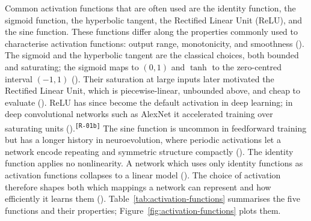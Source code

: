 \documentclass[12pt]{article}
\newcommand{\revID}[1]{\textsuperscript{\scriptsize\texttt{[#1]}}}
\newcommand{\revRepeat}[2]{\textcolor{revTeal}{#2}\revID{#1}}
\begin{document}
Common activation functions that are often used are the identity function, the sigmoid function, the hyperbolic tangent, the Rectified Linear Unit (ReLU), and the sine function.
These functions differ along the properties commonly used to characterise activation functions: output range, monotonicity, and smoothness (\cite{dubey_activation_2022}).
The sigmoid and the hyperbolic tangent are the classical choices, both bounded and saturating; the sigmoid maps to $(0,1)$ and $\tanh$ to the zero-centred interval $(-1,1)$ (\cite{dubey_activation_2022}).
Their saturation at large inputs later motivated the Rectified Linear Unit, which is piecewise-linear, unbounded above, and cheap to evaluate (\cite{nair_rectified_2010}).
\revRepeat{R-01b}{ReLU has since become the default activation in deep learning; in deep convolutional networks such as AlexNet it accelerated training over saturating units (\cite{krizhevsky_imagenet_2012,ramachandran_searching_2017}).}
The sine function is uncommon in feedforward training but has a longer history in neuroevolution, where periodic activations let a network encode repeating and symmetric structure compactly (\cite{stanley_compositional_2007}).
The identity function applies no nonlinearity. A network which uses only identity functions as activation functions collapses to a linear model (\cite{dubey_activation_2022}).
The choice of activation therefore shapes both which mappings a network can represent and how efficiently it learns them (\cite{dubey_activation_2022}).
Table~\ref{tab:activation-functions} summarises the five functions and their properties; Figure~\ref{fig:activation-functions} plots them.
\end{document}
